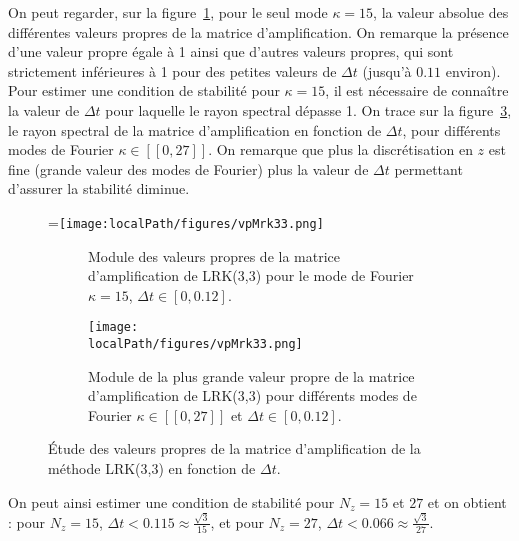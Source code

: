 On peut regarder, sur la figure~\ref{fig:3:vpMrk33_k15}, pour le seul mode $\kappa=15$, la valeur absolue des différentes valeurs propres de la matrice d'amplification. On remarque la présence d'une valeur propre égale à 1 ainsi que d'autres valeurs propres, qui sont strictement inférieures à 1 pour des petites valeurs de $\Delta t$ (jusqu'à $0.11$ environ). Pour estimer une condition de stabilité pour $\kappa=15$, il est nécessaire de connaître la valeur de $\Delta t$ pour laquelle le rayon spectral dépasse 1. On trace sur la figure~\ref{fig:3:vpMrk33}, le rayon spectral de la matrice d'amplification en fonction de $\Delta t$, pour différents modes de Fourier $\kappa\in[\![0,27]\!]$. On remarque que plus la discrétisation en $z$ est fine (grande valeur des modes de Fourier) plus la valeur de $\Delta t$ permettant d'assurer la stabilité diminue.
\begin{figure}[h]
  \centering
  =\hbox{\texttt{[image: \\localPath/figures/vpMrk33.png]}}
  \begin{subfigure}[b]{.45\linewidth}
    \caption{Module des valeurs propres de la matrice d'amplification de LRK(3,3) pour le mode de Fourier $\kappa=15$, $\Delta t\in[0,0.12]$.\\ }
    \label{fig:3:vpMrk33_k15}
  \end{subfigure}
  \begin{subfigure}[b]{.45\linewidth}
    \texttt{[image: \\localPath/figures/vpMrk33.png]}
    \caption{Module de la plus grande valeur propre de la matrice d'amplification de LRK(3,3) pour différents modes de Fourier $\kappa\in[\![0,27]\!]$ et $\Delta t\in[0,0.12]$.}
    \label{fig:3:vpMrk33}
  \end{subfigure}
  \caption{Étude des valeurs propres de la matrice d'amplification de la méthode LRK(3,3) en fonction de $\Delta t$.}
\end{figure}
On peut ainsi estimer une condition de stabilité pour $N_z = 15$ et $27$ et on obtient : pour $N_z = 15$, $\Delta t <0.115 \approx \frac{\sqrt{3}}{15}$, et pour $N_z = 27$, $\Delta t <0.066 \approx \frac{\sqrt{3}}{27}$.

